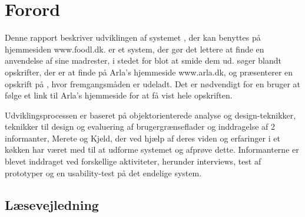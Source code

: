 \chapter*{Forord}
Denne rapport beskriver udviklingen af systemet \Foodl, der kan benyttes på hjemmesiden www.foodl.dk. \Foodl er et system, der gør det lettere at finde en anvendelse af sine madrester, i stedet for blot at smide dem ud. \Foodl søger blandt opskrifter, der er at finde på Arla's hjemmeside www.arla.dk, og præsenterer en opskrift på \Foodl, hvor fremgangsmåden er udeladt. Det er nødvendigt for en bruger at følge et link til Arla's hjemmeside for at få vist hele opskriften.

Udviklingsprocessen er baseret på objektorienterede analyse og design-teknikker\cite{ooad}, teknikker til design og evaluering af brugergrænseflader\cite{deb} og inddragelse af 2 informanter, Merete og Kjeld, der ved hjælp af deres viden og erfaringer i et køkken har været med til at udforme systemet og afprøve dette. Informanterne er blevet inddraget ved forskellige aktiviteter, herunder interviews, test af prototyper og en usability-test på det endelige system.

\section*{Læsevejledning}

